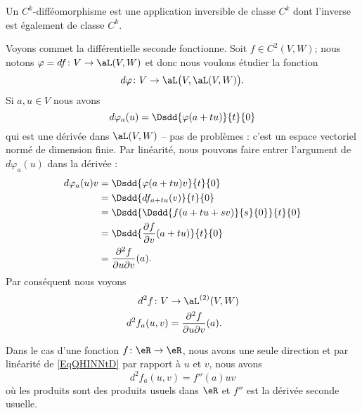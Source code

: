 \begin{definition}
    Un \( C^k\)-difféomorphisme est une application inversible de classe \( C^k\) dont l'inverse est également de classe \( C^k\).
\end{definition}

\begin{example} \label{ExZHZYcNH}
    Voyons commet la différentielle seconde fonctionne. Soit \( f\in C^2(V,W)\); nous notons \( \varphi=df\colon V\to \aL(V,W)\) et donc nous voulons étudier la fonction
    \begin{equation}
        d\varphi\colon V\to \aL\big( V,\aL(V,W) \big).
    \end{equation}
    Si \( a,u\in V\)  nous avons
    \begin{equation}
        d\varphi_a(u)=\Dsdd{ \varphi(a+tu) }{t}{0}
    \end{equation}
    qui est une dérivée dans \( \aL(V,W)\) -- pas de problèmes : c'est un espace vectoriel normé de dimension finie. Par linéarité, nous pouvons faire entrer l'argument de \( d\varphi_a(u)\) dans la dérivée :
    \begin{subequations}
        \begin{align}
            d\varphi_a(u)v&=\Dsdd{ \varphi(a+tu)v }{t}{0}\\
            &=\Dsdd{ df_{a+tu}(v) }{t}{0}\\
            &=\Dsdd{  \Dsdd{ f(a+tu+sv) }{s}{0}  }{t}{0}\\
            &=\Dsdd{ \frac{ \partial f }{ \partial v }(a+tu) }{t}{0}\\
            &=\frac{ \partial^2f  }{ \partial u\partial v }(a).
        \end{align}
    \end{subequations}
    Par conséquent nous voyons
    \begin{equation}\label{EqQHINNtD}
        \begin{aligned}
            d^2f\colon V&\to \aL^{(2)}(V,W) \\
            d^2f_a(u,v)&=\frac{ \partial^2f  }{ \partial u\partial v }(a). 
        \end{aligned}
    \end{equation}
    
    Dans le cas d'une fonction \( f\colon \eR\to \eR\), nous avons une seule direction et par linéarité de \eqref{EqQHINNtD} par rapport à \( u\) et \( v\), nous avons
    \begin{equation}
        d^2f_a(u,v)=f''(a)uv
    \end{equation}
    où les produits sont des produits usuels dans \( \eR\) et \( f''\) est la dérivée seconde usuelle.
\end{example}


